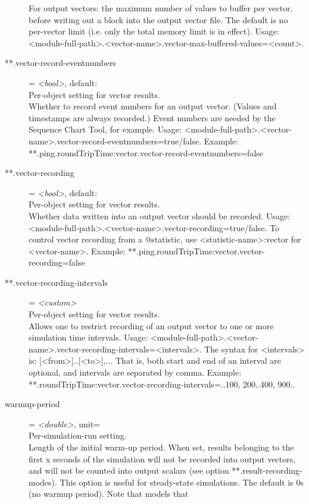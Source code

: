 \begin{description}
    For output vectors: the maximum number of values to buffer per vector,
    before writing out a block into the output vector file. The default is no
    per-vector limit (i.e. only the total memory limit is in effect). Usage:
    <module-full-path>.<vector-name>.vector-max-buffered-values=<count>.
\item[**.vector-record-eventnumbers] = \textit{<bool>}, default: \\
    Per-object setting for vector results.\\
    Whether to record event numbers for an output vector. (Values and
    timestamps are always recorded.) Event numbers are needed by the Sequence
    Chart Tool, for example. Usage:
    <module-full-path>.<vector-name>.vector-record-eventnumbers=true/false.
    Example: **.ping.roundTripTime:vector.vector-record-eventnumbers=false
\item[**.vector-recording] = \textit{<bool>}, default: \\
    Per-object setting for vector results.\\
    Whether data written into an output vector should be recorded. Usage:
    <module-full-path>.<vector-name>.vector-recording=true/false. To control
    vector recording from a @statistic, use <statistic-name>:vector for
    <vector-name>. Example: **.ping.roundTripTime:vector.vector-recording=false
\item[**.vector-recording-intervals] = \textit{<custom>}\\
    Per-object setting for vector results.\\
    Allows one to restrict recording of an output vector to one or more
    simulation time intervals. Usage:
    <module-full-path>.<vector-name>.vector-recording-intervals=<intervals>.
    The syntax for <intervals> is: [<from>]..[<to>],... That is, both start and
    end of an interval are optional, and intervals are separated by comma.
    Example: **.roundTripTime:vector.vector-recording-intervals=..100,
    200..400, 900..
\item[warmup-period] = \textit{<double>}, unit=\\
    Per-simulation-run setting.\\
    Length of the initial warm-up period. When set, results belonging to the
    first x seconds of the simulation will not be recorded into output vectors,
    and will not be counted into output scalars (see option
    **.result-recording-modes). This option is useful for steady-state
    simulations. The default is 0s (no warmup period). Note that models that

\end{description}
